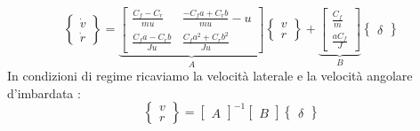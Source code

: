 \begin{equation}
\begin{Bmatrix}
\dot v\\
\dot r
\end{Bmatrix}
=
\underbrace{\begin{bmatrix}
\frac{ C_f - C_r}{mu} & \frac{- C_fa + C_rb}{mu} - u\\
\frac{ C_fa - C_rb}{Ju}  & \frac{C_f a^2 + C_r b^2}{Ju} 
\end{bmatrix}}_{A}
\begin{Bmatrix}
v\\
r
\end{Bmatrix}+
\underbrace{\begin{bmatrix}
\frac{C_f}{m}\\
\frac{aC_f}{J} 
\end{bmatrix}}_{B}
\begin{Bmatrix}
\delta
\end{Bmatrix}
\end{equation}
In condizioni di regime ricaviamo la velocità laterale e la velocità angolare d'imbardata :
\begin{equation}
\begin{Bmatrix}
v\\
r
\end{Bmatrix}
=
\begin{bmatrix}
A 
\end{bmatrix}^{-1}
\begin{bmatrix}
B 
\end{bmatrix}
\begin{Bmatrix}
\delta
\end{Bmatrix}
\end{equation}


